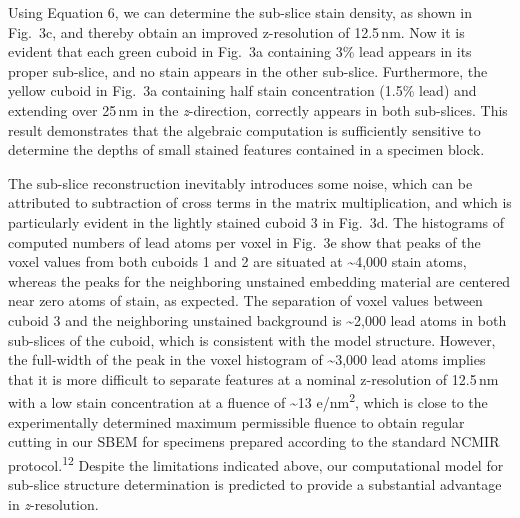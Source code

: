 \documentclass{article}
\newcommand{\cit}[1]{\textsuperscript{#1}}
\begin{document}

Using Equation 6, we can determine the sub-slice stain density, as shown in Fig.~3c, and thereby obtain an improved z-resolution of 12.5\,nm. Now it is evident that each green cuboid in Fig.~3a containing 3\% lead appears in its proper sub-slice, and no stain appears in the other sub-slice. Furthermore, the yellow cuboid in Fig.~3a containing half stain concentration (1.5\% lead) and extending over 25\,nm in the \emph{z}-direction, correctly appears in both sub-slices. This result demonstrates that the algebraic computation is sufficiently sensitive to determine the depths of small stained features contained in a specimen block.

The sub-slice reconstruction inevitably introduces some noise, which can be attributed to subtraction of cross terms in the matrix multiplication, and which is particularly evident in the lightly stained cuboid 3 in Fig.~3d. The histograms of computed numbers of lead atoms per voxel in Fig.~3e show that peaks of the voxel values from both cuboids 1 and 2 are situated at \textasciitilde4,000 stain atoms, whereas the peaks for the neighboring unstained embedding material are centered near zero atoms of stain, as expected. The separation of voxel values between cuboid 3 and the neighboring unstained background is \textasciitilde2,000 lead atoms in both sub-slices of the cuboid, which is consistent with the model structure. However, the full-width of the peak in the voxel histogram of \textasciitilde3,000 lead atoms implies that it is more difficult to separate features at a nominal z-resolution of 12.5\,nm with a low stain concentration at a fluence of \textasciitilde13 e/nm\textsuperscript{2}, which is close to the experimentally determined maximum permissible fluence to obtain regular cutting in our SBEM for specimens prepared according to the standard NCMIR protocol.\cit{12} Despite the limitations indicated above, our computational model for sub-slice structure determination is predicted to provide a substantial advantage in \emph{z}-resolution.
\end{document}
